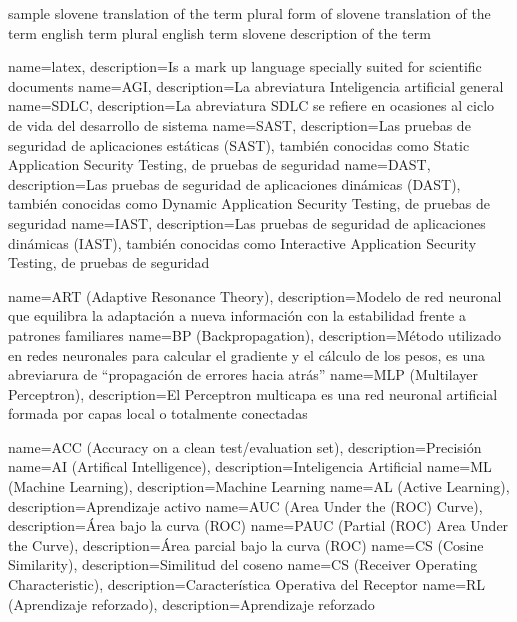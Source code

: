 \makeglossaries


\addterm
{sample}%
{slovene translation of the term}%
{plural form of slovene translation of the term}%
{english term}%
{plural english term}%
{slovene description of the term}


        {name={latex},      description={Is a mark up language specially suited for scientific documents}}
          {name={AGI},        description={La abreviatura Inteligencia artificial general}}
         {name={SDLC},       description={La abreviatura SDLC se refiere en ocasiones al ciclo de vida del desarrollo de sistema}}
         {name={SAST},       description={Las pruebas de seguridad de aplicaciones estáticas (SAST), también conocidas como Static Application Security Testing, de pruebas de seguridad}}
         {name={DAST},       description={Las pruebas de seguridad de aplicaciones dinámicas (DAST), también conocidas como Dynamic Application Security Testing, de pruebas de seguridad}}
         {name={IAST},       description={Las pruebas de seguridad de aplicaciones dinámicas (IAST), también conocidas como Interactive Application Security Testing, de pruebas de seguridad}}


   {name={ART (Adaptive Resonance Theory)},                description={Modelo de red neuronal que equilibra la adaptación a nueva información con la estabilidad frente a patrones familiares}}
    {name={BP (Backpropagation)},                           description={Método utilizado en redes neuronales para calcular el gradiente y el cálculo de los pesos, es una abreviarura de ``propagación de errores hacia atrás''}}
      {name={MLP (Multilayer Perceptron)},                    description={El Perceptron multicapa es una red neuronal artificial formada por capas local o totalmente conectadas}}

      {name={ACC (Accuracy on a clean test/evaluation set)},  description={Precisión}}
       {name={AI (Artifical Intelligence)},                    description={Inteligencia Artificial}}
       {name={ML (Machine Learning)},                          description={Machine Learning}}
       {name={AL (Active Learning)},                           description={Aprendizaje activo}}
      {name={AUC (Area Under the (ROC) Curve)},               description={Área bajo la curva (ROC)}}
     {name={PAUC (Partial (ROC) Area Under the Curve)},      description={Área parcial bajo la curva (ROC)}}
       {name={CS (Cosine Similarity)},                         description={Similitud del coseno}}
      {name={CS (Receiver Operating Characteristic)},         description={Característica Operativa del Receptor}}
       {name={RL (Aprendizaje reforzado)},                     description={Aprendizaje reforzado}}


